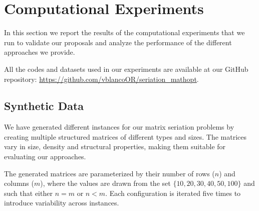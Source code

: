 \documentclass[a4paper,11pt, reqno]{amsart}
\begin{document}
\section{Computational Experiments}  \label{sec:4}


In this section we report the results of the computational experiments that we run to validate our proposals and analyze the performance of the different approaches we provide.

All the codes and datasets used in our experiments are available at our GitHub repository: \url{https://github.com/vblancoOR/seriation_mathopt}.

\subsection{Synthetic Data}

We have generated different instances for our matrix seriation problems by creating multiple structured matrices of different types and sizes. The matrices vary in size, density and structural properties, making them suitable for evaluating our approaches.

The generated matrices are parameterized by their number of rows ($n$) and columns ($m$), where the values are drawn from the set $\{10, 20, 30, 40, 50, 100\}$ and such that either $n=m$ or $n<m$. Each configuration is iterated five times to introduce variability across instances.
\end{document}
